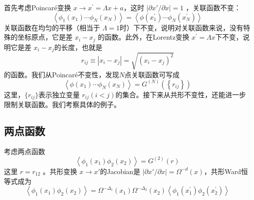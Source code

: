 首先考虑Poincaré变换 $x \rightarrow x^{\prime}=\Lambda x+a $，这时 $|\partial x'/\partial x|=1$ ，关联函数不变：
\begin{equation}
	\left\langle\phi_1\left(x_{1}\right) \cdots \phi_{N}\left(x_{N}\right)\right\rangle=\left\langle\phi\left(x_{1}^{\prime}\right) \cdots \phi_{N}\left(x_{N}^{\prime}\right)\right\rangle
\end{equation}
关联函数在均匀的平移（相当于 $\Lambda=1 $时）下不变，说明对关联函数来说，没有特殊的坐标原点，它是差 $x_i-x_j$ 的函数。此外，在Lorentz变换 $x^{\prime}=\Lambda x $下不变，说明它是差 $x_i-x_j $的长度，也就是
\begin{equation}
	r_{i j} \equiv\left|x_{i}-x_{j}\right|=\sqrt{\left(x_{i}-x_{j}\right)^{2}}
\end{equation}
的函数。我们从Poincaré不变性，发现$ N $点关联函数可写成
\begin{equation}
	\left\langle\phi\left(x_{1}\right) \cdots \phi_{N}\left(x_{N}\right)\right\rangle=G^{(N)}\left(\left\{r_{i j}\right\}\right)
\end{equation}
这里，$ \{r_{i j}\} $表示独立变量 $r_{ij} (i<j )$的集合。接下来从共形不变性，还能进一步限制关联函数。我们考察具体的例子。
\subsection{两点函数}
考虑两点函数
\begin{equation}
	\left\langle\phi_{1}\left(x_{1}\right) \phi_{2}\left(x_{2}\right)\right\rangle=G^{(2)}(r)
\end{equation}
这里 $r=r_{12}$ 。共形变换 $x\to x' $的Jacobian是 $|\partial x'/\partial x|=\Omega^{-d}(x) $，共形Ward恒等式成为
\begin{equation}
	\left\langle\phi_{1}\left(x_{1}\right) \phi_{2}\left(x_{2}\right)\right\rangle=\Omega^{-\Delta_{1}}\left(x_{1}\right) \Omega^{-\Delta_{2}}\left(x_{2}\right)\left\langle\phi_{1}\left(x_{1}^{\prime}\right) \phi_{2}\left(x_{2}^{\prime}\right)\right\rangle
\end{equation}

